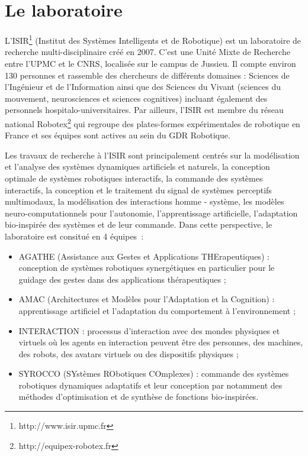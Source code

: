\documentclass{llncs}
\begin{document}
\section{Le laboratoire}

L'ISIR\footnote{http://www.isir.upmc.fr} (Institut des Systèmes Intelligents et de Robotique) est un laboratoire de recherche multi-disciplinaire créé en 2007. C'est une Unité Mixte de Recherche entre l'UPMC et le CNRS, localisée sur le campus de Jussieu. Il compte environ 130 personnes et rassemble des chercheurs de différents domaines : Sciences de l’Ingénieur et de l’Information ainsi que des Sciences du Vivant (sciences du mouvement, neurosciences et sciences cognitives)  incluant également des personnels hospitalo-universitaires. Par ailleurs, l'ISIR est membre du réseau national Robotex\footnote{http://equipex-robotex.fr} qui regroupe des plates-formes expérimentales de robotique en France et ses équipes sont actives au sein du GDR Robotique.

Les travaux de recherche à l'ISIR sont principalement centrés sur la modélisation et l'analyse des systèmes dynamiques artificiels et naturels, la conception optimale de systèmes robotiques interactifs, la commande des systèmes interactifs, la conception et le traitement du signal de systèmes perceptifs multimodaux, la modélisation des interactions homme - système, les modèles neuro-computationnels pour l’autonomie, l'apprentissage artificielle, l'adaptation bio-inspirée des systèmes et de leur commande. Dans cette perspective, le laboratoire est consitué en 4 équipes~:
\begin{itemize}
\item AGATHE (Assistance aux Gestes et Applications THErapeutiques) : conception de systèmes robotiques synergétiques en particulier pour le guidage des gestes dans des applications thérapeutiques ;
\item AMAC (Architectures et Modèles pour l'Adaptation et la Cognition) : apprentissage artificiel et l’adaptation du comportement à l’environnement ;
\item INTERACTION : processus d’interaction avec des mondes physiques et virtuels où les agents en interaction peuvent être des personnes, des machines, des robots, des avatars virtuels ou des dispositifs physiques ;
\item SYROCCO (SYstèmes RObotiques COmplexes) : commande des systèmes robotiques dynamiques adaptatifs et leur conception par notamment des méthodes d’optimisation et de synthèse de fonctions bio-inspirées.
\end{itemize}
\end{document}
